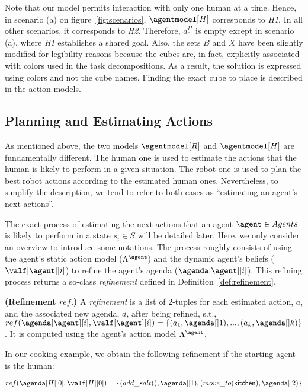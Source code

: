 Note that our model permits interaction with only one human at a time. Hence, in scenario (a) on figure~\ref{fig:scenarios}, $\agentmodel[H]$ corresponds to \textit{H1}. In all other scenarios, it corresponds to \textit{H2}.
Therefore, $d^H_0$ is empty except in scenario (a), where \textit{H1} establishes a shared goal. Also, the sets $B$ and $X$ have been slightly modified for legibility reasons because the cubes are, in fact, explicitly associated with colors used in the task decompositions. As a result, the solution is expressed using colors and not the cube names. Finding the exact cube to place is described in the action models.

\subsection*{Planning and Estimating Actions}

As mentioned above, the two models $\agentmodel[R]$ and $\agentmodel[H]$ are fundamentally different. The human one is used to estimate the actions that the human is likely to perform in a given situation. The robot one is used to plan the best robot actions according to the estimated human ones. Nevertheless, to simplify the description, we tend to refer to both cases as ``estimating an agent's next actions''.

The exact process of estimating the next actions that an agent $\agent \in Agents$ is likely to perform in a state $s_i \in S$ will be detailed later. Here, we only consider an overview to introduce some notations. 
The process roughly consists of using the agent's static action model ($\Lambda^{\agent}$) 
and the dynamic agent's beliefs ($\valf[\agent][i]$)
to refine the agent's agenda ($\agenda[\agent][i]$). This refining process returns a so-class \textit{refinement} defined in Definition~\ref{def:refinement}.

\begin{definition}
    \textbf{(Refinement $ref$.)} A \emph{refinement} is a list of 2-tuples for each estimated action, $a$, and the associated new agenda, $d$, after being refined, s.t., $ref(\agenda[\agent][i], \valf[\agent][i]) = \{ (a_1,\agenda[]1), ..., (a_k,\agenda[]k) \}$. It is computed using the agent's action model $\Lambda^{\agent}$.
    \label{def:refinement}
\end{definition}


In our cooking example, we obtain the following refinement if the starting agent is the human:

\begin{equation*}
    ref(\agenda[H][0], \valf[H][0]) = \{ (add\_salt(),\agenda[]1), (move\_to(\textsf{kitchen}),\agenda[]2) \}
\end{equation*}

